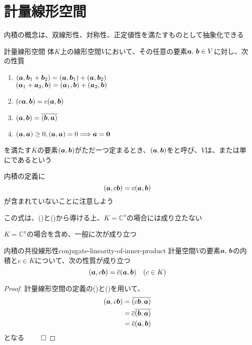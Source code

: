 \documentclass[../../../topic_linear-algebra]{subfiles}
\begin{document}
\sectionline
\section{計量線形空間}

内積の概念は、双線形性、対称性、正定値性を満たすものとして抽象化できる

\begin{definition*}{計量線形空間}
  体$K$上の線形空間$V$において、その任意の要素$\vb*{a},\, \vb*{b} \in V$に対し、次の性質
  \begin{enumerate}[label=\romanlabel]
    \item $(\vb*{a}, \vb*{b}_1 + \vb*{b}_2) = (\vb*{a}, \vb*{b}_1) + (\vb*{a}, \vb*{b}_2)$ \\
          $(\vb*{a}_1 + \vb*{a}_2, \vb*{b}) = (\vb*{a}_1, \vb*{b}) + (\vb*{a}_2, \vb*{b})$
    \item $(c\vb*{a}, \vb*{b}) = c(\vb*{a}, \vb*{b})$
    \item $(\vb*{a}, \vb*{b}) = \overline{(\vb*{b}, \vb*{a})}$
    \item $(\vb*{a}, \vb*{a}) \geq 0, (\vb*{a}, \vb*{a}) = 0 \Longrightarrow \vb*{a} = \vb*{0}$
  \end{enumerate}
  を満たす$K$の要素$(\vb*{a},\vb*{b})$がただ一つ定まるとき、$(\vb*{a},\vb*{b})$をと呼び、$V$は、または単にであるという
\end{definition*}

内積の定義に
\begin{equation*}
  (\vb*{a}, c\vb*{b}) = c(\vb*{a}, \vb*{b})
\end{equation*}
が含まれていないことに注意しよう

この式は、()と()から導ける上、$K = \mathbb{C}^n$の場合には成り立たない

\br

$K = \mathbb{C}^n$の場合を含め、一般に次が成り立つ

\begin{theorem}{内積の共役線形性}{conjugate-linearity-of-inner-product}
  計量空間$V$の要素$\vb*{a},\,\vb*{b}$の内積と$c \in K$について、次の性質が成り立つ
  \begin{equation*}
    (\vb*{a},c\vb*{b}) = \overline{c}(\vb*{a},\vb*{b}) \quad (c \in K)
  \end{equation*}
\end{theorem}

\begin{proof}
  計量線形空間の定義の()と()を用いて、
  \begin{align*}
    (\vb*{a},c\vb*{b}) & = \overline{(c\vb*{b},\vb*{a})}            \\
                       & = \overline{c}\overline{(\vb*{b},\vb*{a})} \\
                       & = \overline{c}(\vb*{a},\vb*{b})
  \end{align*}
  となる $\qed$
\end{proof}
\end{document}
